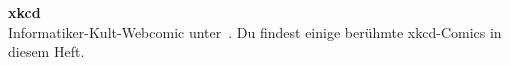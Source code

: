 \begin{multicols}{2}

% 



\textbf{xkcd} \\
Informatiker-Kult-Webcomic unter~. Du findest einige berühmte xkcd-Comics in diesem Heft.



\end{multicols}

